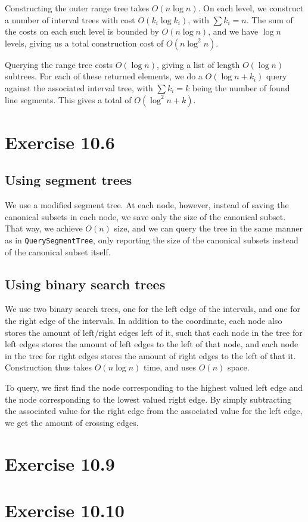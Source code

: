 \documentclass[11pt,a4paper]{article}
\begin{document}
Constructing the outer range tree takes $O(n \log n)$. On each level, we construct a
number of interval trees with cost $O(k_i \log k_i)$, with $\sum k_i = n$. The sum of
the costs on each such level is bounded by $O(n \log n)$, and we have $\log n$ levels,
giving us a total construction cost of $O(n \log^2 n)$.

Querying the range tree costs $O(\log n)$, giving a list of length $O(\log n)$
subtrees. For each of these returned elements, we do a $O(\log n + k_i)$ query
against the associated interval tree, with $\sum k_i = k$ being the number of
found line segments. This gives a total of $O(\log^2 n + k)$.

\section{Exercise 10.6}

\subsection{Using segment trees}

We use a modified segment tree. At each node, however, instead of
saving the canonical subsets in each node, we save only the size of
the canonical subset. That way, we achieve $O(n)$ size, and we can
query the tree in the same manner as in \verb+QuerySegmentTree+, only
reporting the size of the canonical subsets instead of the canonical
subset itself.

\subsection{Using binary search trees}

We use two binary search trees, one for the left edge of the
intervals, and one for the right edge of the intervals. In addition to
the coordinate, each node also stores the amount of left/right edges
left of it, such that each node in the tree for left edges stores the
amount of left edges to the left of that node, and each node in the
tree for right edges stores the amount of right edges to the left of
that it. Construction thus takes $O(n \log n)$ time, and uses $O(n)$
space.

To query, we first find the node corresponding to the highest valued
left edge and the node corresponding to the lowest valued right
edge. By simply subtracting the associated value for the right edge
from the associated value for the left edge, we get the amount of
crossing edges.

\section{Exercise 10.9}

\section{Exercise 10.10}
\end{document}
